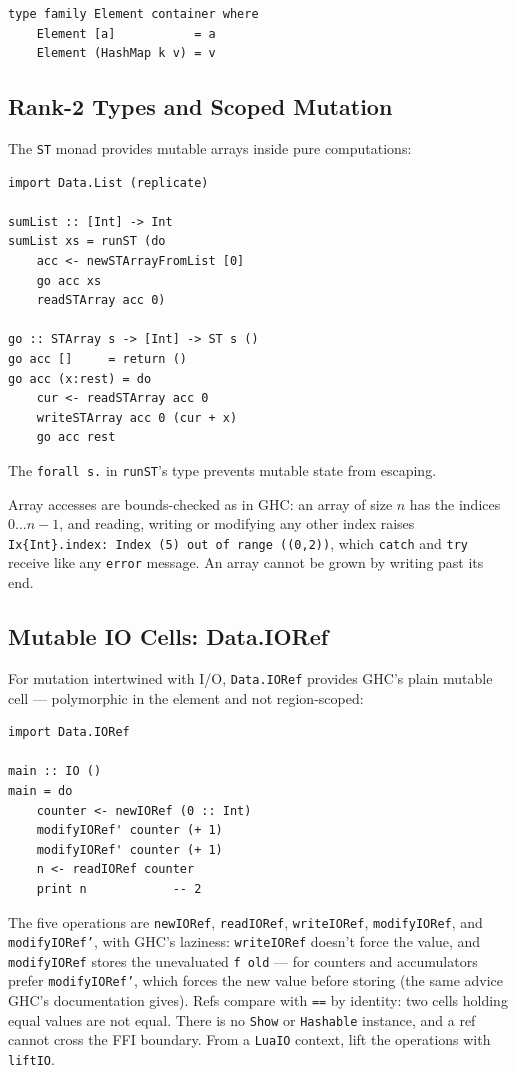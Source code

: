\documentclass[11pt,a4paper]{article}
\begin{document}
\begin{lstlisting}
type family Element container where
    Element [a]           = a
    Element (HashMap k v) = v
\end{lstlisting}

\subsection{Rank-2 Types and Scoped Mutation}

The \texttt{ST} monad provides mutable arrays inside pure computations:

\begin{lstlisting}
import Data.List (replicate)

sumList :: [Int] -> Int
sumList xs = runST (do
    acc <- newSTArrayFromList [0]
    go acc xs
    readSTArray acc 0)

go :: STArray s -> [Int] -> ST s ()
go acc []     = return ()
go acc (x:rest) = do
    cur <- readSTArray acc 0
    writeSTArray acc 0 (cur + x)
    go acc rest
\end{lstlisting}

The \texttt{forall s.} in \texttt{runST}'s type prevents mutable state
from escaping.

Array accesses are bounds-checked as in GHC: an array of size $n$ has
the indices $0 \ldots n-1$, and reading, writing or modifying any other
index raises \texttt{Ix\{Int\}.index: Index (5) out of range ((0,2))},
which \texttt{catch} and \texttt{try} receive like any \texttt{error}
message. An array cannot be grown by writing past its end.

\subsection{Mutable IO Cells: Data.IORef}

For mutation intertwined with I/O, \texttt{Data.IORef} provides GHC's
plain mutable cell --- polymorphic in the element and not region-scoped:

\begin{lstlisting}
import Data.IORef

main :: IO ()
main = do
    counter <- newIORef (0 :: Int)
    modifyIORef' counter (+ 1)
    modifyIORef' counter (+ 1)
    n <- readIORef counter
    print n            -- 2
\end{lstlisting}

The five operations are \texttt{newIORef}, \texttt{readIORef},
\texttt{writeIORef}, \texttt{modifyIORef}, and \texttt{modifyIORef'},
with GHC's laziness: \texttt{writeIORef} doesn't force the value, and
\texttt{modifyIORef} stores the unevaluated \texttt{f old} --- for
counters and accumulators prefer \texttt{modifyIORef'}, which forces
the new value before storing (the same advice GHC's documentation
gives). Refs compare with \texttt{==} by identity: two cells holding
equal values are not equal. There is no \texttt{Show} or
\texttt{Hashable} instance, and a ref cannot cross the FFI boundary.
From a \texttt{LuaIO} context, lift the operations with
\texttt{liftIO}.
\end{document}
